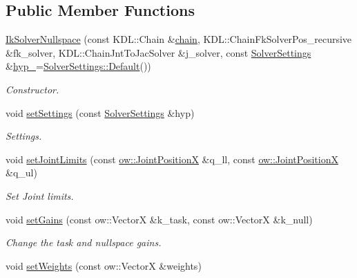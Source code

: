 \subsection*{Public Member Functions}
\begin{DoxyCompactItemize}
\item 
\hyperlink{classow__ik_1_1IkSolverNullspace_a7dcb7fb8ca70075c28516c626f402caa}{Ik\+Solver\+Nullspace} (const K\+D\+L\+::\+Chain \&\hyperlink{classow__ik_1_1IkSolverNullspace_a947bba59c9fbeb748f6daade02e970b5}{chain}, K\+D\+L\+::\+Chain\+Fk\+Solver\+Pos\+\_\+recursive \&fk\+\_\+solver, K\+D\+L\+::\+Chain\+Jnt\+To\+Jac\+Solver \&j\+\_\+solver, const \hyperlink{classow__ik_1_1SolverSettings}{Solver\+Settings} \&\hyperlink{classow__ik_1_1IkSolverNullspace_a6b80962595200794eced47d857e9c796}{hyp\+\_\+}=\hyperlink{classow__ik_1_1SolverSettings_a4dcbab3529df7f321226cd65da491701}{Solver\+Settings\+::\+Default}())\hypertarget{classow__ik_1_1IkSolverNullspace_a7dcb7fb8ca70075c28516c626f402caa}{}\label{classow__ik_1_1IkSolverNullspace_a7dcb7fb8ca70075c28516c626f402caa}

\begin{DoxyCompactList}\small\item\em Constructor. \end{DoxyCompactList}\item 
void \hyperlink{classow__ik_1_1IkSolverNullspace_a46516a217e32c197eb140fd54a66d4da}{set\+Settings} (const \hyperlink{classow__ik_1_1SolverSettings}{Solver\+Settings} \&hyp)
\begin{DoxyCompactList}\small\item\em Settings. \end{DoxyCompactList}\item 
void \hyperlink{classow__ik_1_1IkSolverNullspace_a3150e439a97ba65bbf491887cacda6e2}{set\+Joint\+Limits} (const \hyperlink{classow__core_1_1JointPosition}{ow\+::\+Joint\+PositionX} \&q\+\_\+ll, const \hyperlink{classow__core_1_1JointPosition}{ow\+::\+Joint\+PositionX} \&q\+\_\+ul)
\begin{DoxyCompactList}\small\item\em Set Joint limits. \end{DoxyCompactList}\item 
void \hyperlink{classow__ik_1_1IkSolverNullspace_a14da556c02c7850893bcb44fab34ec7f}{set\+Gains} (const ow\+::\+VectorX \&k\+\_\+task, const ow\+::\+VectorX \&k\+\_\+null)
\begin{DoxyCompactList}\small\item\em Change the task and nullspace gains. \end{DoxyCompactList}\item 
void \hyperlink{classow__ik_1_1IkSolverNullspace_a0aba7d04dc5944588d6d250fd9206173}{set\+Weights} (const ow\+::\+VectorX \&weights)\hypertarget{classow__ik_1_1IkSolverNullspace_a0aba7d04dc5944588d6d250fd9206173}{}\label{classow__ik_1_1IkSolverNullspace_a0aba7d04dc5944588d6d250fd9206173}


\end{DoxyCompactItemize}
